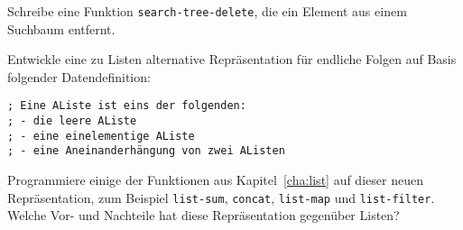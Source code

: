 \begin{aufgabe}
  \label{aufgabe:search-tree-delete}
  Schreibe eine Funktion \texttt{search-tree-delete}, die ein
  Element aus einem Suchbaum entfernt.  
\end{aufgabe}

\begin{aufgabe}
  Entwickle eine zu Listen alternative Repräsentation für endliche
  Folgen auf Basis folgender Datendefinition:
\begin{lstlisting}
; Eine AListe ist eins der folgenden:
; - die leere AListe
; - eine einelementige AListe
; - eine Aneinanderhängung von zwei AListen
\end{lstlisting}
  Programmiere einige der Funktionen aus Kapitel~\ref{cha:list} auf
  dieser neuen Repräsentation, zum Beispiel \lstinline{list-sum},
  \lstinline{concat}, \lstinline{list-map} und
  \lstinline{list-filter}.  Welche Vor- und Nachteile hat diese
  Repräsentation gegenüber Listen?
\end{aufgabe}

